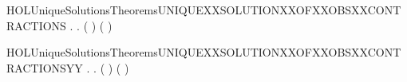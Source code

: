 \newcommand{\HOLUniqueSolutionsTheoremsUNIQUEXXSOLUTIONXXOFXXEXPANSIONSXXLEMMA}{\UseVerbatim{HOLUniqueSolutionsTheoremsUNIQUEXXSOLUTIONXXOFXXEXPANSIONSXXLEMMA}}
\begin{SaveVerbatim}{HOLUniqueSolutionsTheoremsUNIQUEXXSOLUTIONXXOFXXOBSXXCONTRACTIONS}
\HOLTokenTurnstile{} \HOLSymConst{\HOLTokenForall{}}.
         \HOLSymConst{\HOLTokenImp{}}
       \HOLSymConst{\HOLTokenForall{}} .
             ( ) \HOLSymConst{\HOLTokenConj{}}   ( ) \HOLSymConst{\HOLTokenImp{}}
             
\end{SaveVerbatim}
\newcommand{\HOLUniqueSolutionsTheoremsUNIQUEXXSOLUTIONXXOFXXOBSXXCONTRACTIONS}{\UseVerbatim{HOLUniqueSolutionsTheoremsUNIQUEXXSOLUTIONXXOFXXOBSXXCONTRACTIONS}}
\begin{SaveVerbatim}{HOLUniqueSolutionsTheoremsUNIQUEXXSOLUTIONXXOFXXOBSXXCONTRACTIONSYY}
\HOLTokenTurnstile{} \HOLSymConst{\HOLTokenForall{}}.
         \HOLSymConst{\HOLTokenImp{}}
       \HOLSymConst{\HOLTokenForall{}} .
             ( ) \HOLSymConst{\HOLTokenConj{}}   ( ) \HOLSymConst{\HOLTokenImp{}}
             
\end{SaveVerbatim}
\newcommand{\HOLUniqueSolutionsTheoremsUNIQUEXXSOLUTIONXXOFXXOBSXXCONTRACTIONSYY}{\UseVerbatim{HOLUniqueSolutionsTheoremsUNIQUEXXSOLUTIONXXOFXXOBSXXCONTRACTIONSYY}}
